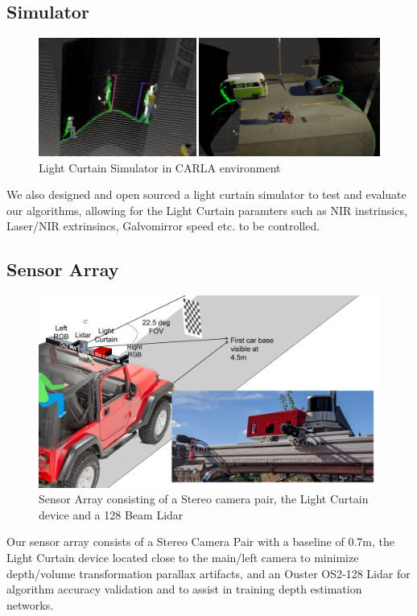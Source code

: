 \subsection{Simulator}

\begin{figure}[h]
   \centering
   \begin{minipage}{0.4\textwidth}
       \centering
       \includegraphics[width=1.0\textwidth]{figures/sim.png}
   \end{minipage}\hfill
   \centering
   \caption{Light Curtain Simulator in CARLA environment}
\end{figure}
We also designed and open sourced a light curtain simulator \cite{raaj2019} to test and evaluate our algorithms, allowing for the Light Curtain paramters such as NIR instrinsics, Laser/NIR extrinsincs, Galvomirror speed etc. to be controlled.

\subsection{Sensor Array}

\begin{figure}[h]
   \centering
   \begin{minipage}{0.5\textwidth}
       \centering
       \includegraphics[width=1.0\textwidth]{figures/array.pdf}
   \end{minipage}\hfill
   \centering
   \caption{Sensor Array consisting of a Stereo camera pair, the Light Curtain device and a 128 Beam Lidar}
\end{figure}

Our sensor array consists of a Stereo Camera Pair with a baseline of 0.7m, the Light Curtain device located close to the main/left camera to minimize depth/volume transformation parallax artifacts, and an Ouster OS2-128 Lidar for algorithm accuracy validation and to assist in training depth estimation networks.